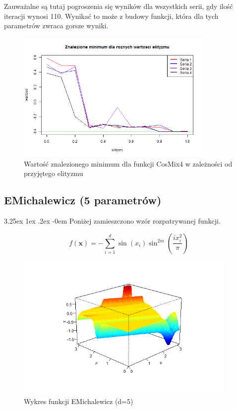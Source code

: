 \documentclass[11pt, a4paper]{article}
\makeatletter
\newcommand{\fbi}{\leavevmode{\parindent=1em\indent}}
\renewcommand\paragraph{\@startsection{paragraph}{5}{\z@}
  {3.25ex \@plus1ex \@minus.2ex}
  {-0em}
  {\normalfont\normalsize\bfseries}}
\makeatother
\begin{document}
\fbi
Zauważalne są tutaj pogroszenia się wyników dla wszystkich serii, gdy ilość iteracji wynosi 110. Wynikać to może z budowy funkcji, która dla tych parametrów zwraca gorsze wyniki.

\begin{figure}[H]
	\begin{center}
		\includegraphics[width=0.85\textwidth]{./assets/CosMix46.png}
		\caption{Wartość znalezionego minimum dla funkcji CosMix4 w zależności od przyjętego elityzmu}
		\label{fig:cosmix46}
	\end{center}
\end{figure}

\newpage
\subsection{EMichalewicz (5 parametrów)}
\paragraph{}
Poniżej zamieszczono wzór rozpatrywanej funkcji.

\begin{equation}\label{eq:emichalewicz}
f(\boldsymbol{x}) = - \sum_{i=1}^{d} \sin(x_i) \sin^{2m} (\frac{i x_i^2}{\pi})
\end{equation}

\begin{figure}[H]
	\begin{center}
		\includegraphics[width=0.95\textwidth]{./assets/EMichalewicz1.png}
		\caption{Wykres funkcji EMichalewicz (d=5)}
		\label{fig:emichalewicz1}
	\end{center}
\end{figure}
\end{document}
